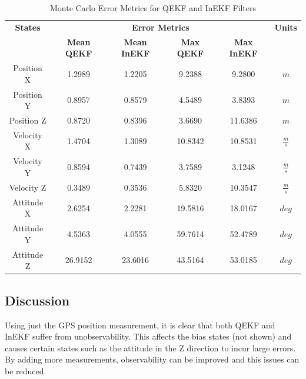 \begin{table}[H]
\centering
\begin{tabular}{|c|c|c|c|c|c|}
    \hline
    \textbf{States} & \multicolumn{4}{|c|}{\textbf{Error Metrics}} & \textbf{Units} \\
    \cline{2-5}
    & \textbf{Mean QEKF} & \textbf{Mean InEKF} & \textbf{Max QEKF} & \textbf{Max InEKF} & \\
    \hline
    Position X & 1.2989 & 1.2205 & 9.2388 & 9.2800 & $m$ \\
    Position Y & 0.8957 & 0.8579 & 4.5489 & 3.8393 & $m$ \\
    Position Z & 0.8720 & 0.8396 & 3.6690 & 11.6386 & $m$ \\
    \hline
    Velocity X & 1.4704 & 1.3089 & 10.8342 & 10.8531 & $\frac{m}{s}$ \\
    Velocity Y & 0.8594 & 0.7439 & 3.7589 & 3.1248 & $\frac{m}{s}$ \\
    Velocity Z & 0.3489 & 0.3536 & 5.8320 & 10.3547 & $\frac{m}{s}$ \\
    \hline
    Attitude X & 2.6254 & 2.2281 & 19.5816 & 18.0167 & $deg$ \\
    Attitude Y & 4.5363 & 4.0555 & 59.7614 & 52.4789 & $deg$ \\
    Attitude Z & 26.9152 & 23.6016 & 43.5164 & 53.0185 & $deg$ \\
    \hline
\end{tabular}
\caption{Monte Carlo Error Metrics for QEKF and InEKF Filters}
\label{tab: error metrics}
\end{table}



\subsection{Discussion}
Using just the GPS position measurement, it is clear that both QEKF and InEKF suffer from unobservability. This affects the bias states (not shown) and causes certain states such as the attitude in the Z direction to incur large errors. By adding more measurements, observability can be improved and this issues can be reduced.

